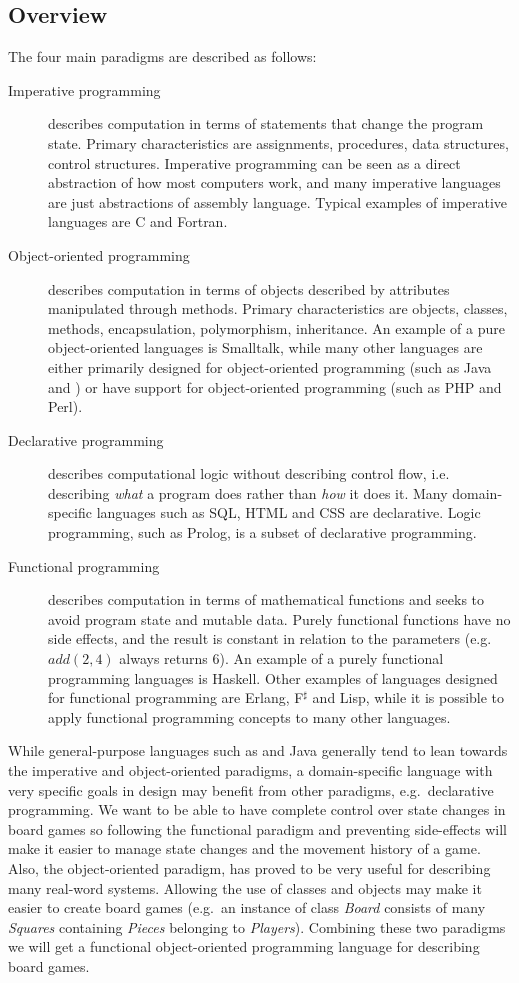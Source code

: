 \subsection{Overview}
The four main paradigms are described as follows:\cite{fourparadigms}
\begin{description}
\item[Imperative programming] describes computation in terms of statements that
  change the program state. Primary characteristics are assignments, procedures,
  data structures, control structures. Imperative programming can be seen as a
  direct abstraction of how most computers work, and many imperative languages
  are just abstractions of assembly language. Typical examples of imperative
  languages are C and Fortran.
\item[Object-oriented programming] describes computation in terms of objects
  described by attributes manipulated through methods. Primary characteristics
  are objects, classes, methods, encapsulation, polymorphism, inheritance. An
  example of a pure object-oriented languages is Smalltalk, while many other
  languages are either primarily designed for object-oriented programming (such
  as Java and \CS{}) or have support for object-oriented programming (such as PHP
  and Perl).
\item[Declarative programming] describes computational logic without describing
  control flow, i.e. describing {\em what} a program does rather than {\em how}
  it does it. Many domain-specific languages such as SQL, HTML and CSS are
  declarative. Logic programming, such as Prolog, is a subset of declarative
  programming.
\item[Functional programming] describes computation in terms of mathematical
  functions and seeks to avoid program state and mutable data. Purely functional
  functions have no side effects, and the result is constant in relation to the
  parameters (e.g. $add(2, 4)$ always returns $6$). An example of a purely
  functional programming languages is Haskell. Other examples of languages
  designed for functional programming are Erlang, F$^\sharp$ and Lisp, while it is
  possible to apply functional programming concepts to many other languages.
\end{description}


While general-purpose languages such as \CS{} and Java generally tend to lean
towards the imperative and object-oriented paradigms, a domain-specific
language with very specific goals in design may benefit from other paradigms,
e.g.\ declarative programming. We want to be able to have complete control
over state changes in board games so following the functional paradigm
and preventing side-effects will make it easier to manage state changes
and the movement history of a game. Also, the object-oriented paradigm,
has proved to be very useful for describing many real-word systems. Allowing
the use of classes and objects may make it easier to create board games
(e.g.\ an instance of class \emph{Board} consists of many \emph{Squares} 
containing \emph{Pieces} belonging to \emph{Players}). Combining these two
paradigms we will get a functional object-oriented programming language
for describing board games.

